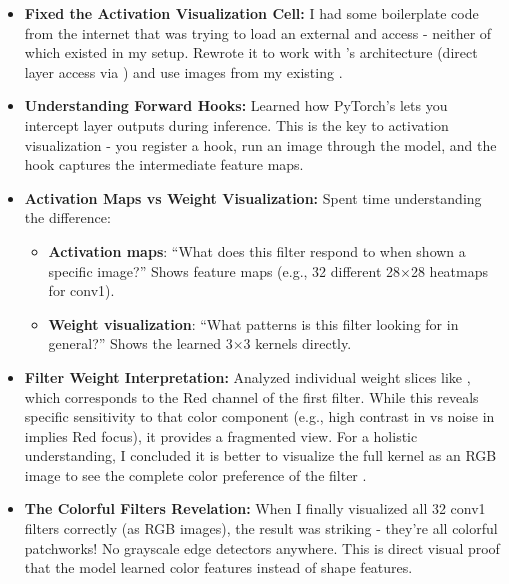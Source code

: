 \documentclass[9pt,a4paper,twocolumn,twoside]{tau-class/tau}
\begin{document}
        \begin{itemize}
            \item \textbf{Fixed the Activation Visualization Cell:} I had some boilerplate code from the internet that was trying to load an external  and access  - neither of which existed in my setup. Rewrote it to work with 's architecture (direct layer access via ) and use images from my existing .

            \item \textbf{Understanding Forward Hooks:} Learned how PyTorch's  lets you intercept layer outputs during inference. This is the key to activation visualization - you register a hook, run an image through the model, and the hook captures the intermediate feature maps.

            \item \textbf{Activation Maps vs Weight Visualization:} Spent time understanding the difference:
            \begin{itemize}
                \item \textbf{Activation maps}: ``What does this filter respond to when shown a specific image?'' Shows feature maps (e.g., 32 different 28$\times$28 heatmaps for conv1).
                \item \textbf{Weight visualization}: ``What patterns is this filter looking for in general?'' Shows the learned 3$\times$3 kernels directly.
            \end{itemize}

            \item \textbf{Filter Weight Interpretation:} Analyzed individual weight slices like , which corresponds to the Red channel of the first filter. While this reveals specific sensitivity to that color component (e.g., high contrast in  vs noise in  implies Red focus), it provides a fragmented view. For a holistic understanding, I concluded it is better to visualize the full  kernel as an RGB image to see the complete color preference of the filter \cite{pytorch2018filtervis}.

            \item \textbf{The Colorful Filters Revelation:} When I finally visualized all 32 conv1 filters correctly (as RGB images), the result was striking - they're all colorful patchworks! No grayscale edge detectors anywhere. This is direct visual proof that the model learned color features instead of shape features.
        \end{itemize}
\end{document}
